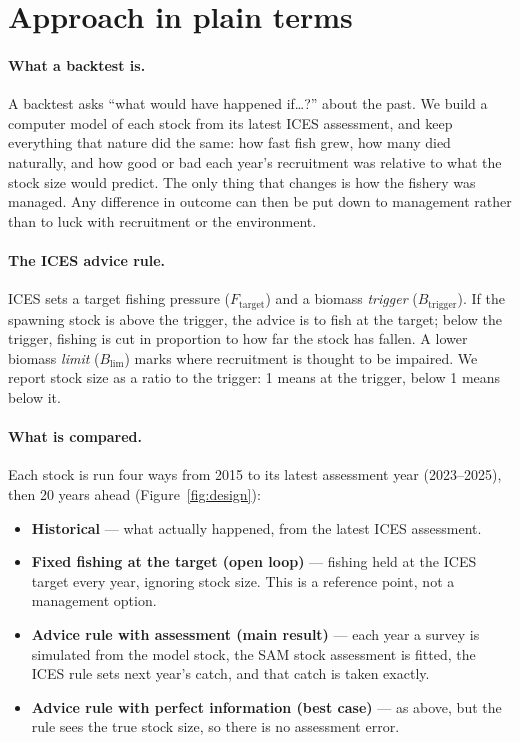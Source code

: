 \documentclass[11pt,a4paper]{article}
\newcommand{\Btrig}{B_{\mathrm{trigger}}}
\newcommand{\Blim}{B_{\mathrm{lim}}}
\newcommand{\Ftar}{F_{\mathrm{target}}}
\begin{document}
\section{Approach in plain terms}
\label{sec:approach}

\paragraph{What a backtest is.} A backtest asks ``what would have happened
if\dots?'' about the past. We build a computer model of each stock from its
latest ICES assessment, and keep everything that nature did the same: how
fast fish grew, how many died naturally, and how good or bad each year's
recruitment was relative to what the stock size would predict. The only
thing that changes is how the fishery was managed. Any difference in
outcome can then be put down to management rather than to luck with
recruitment or the environment.

\paragraph{The ICES advice rule.} ICES sets a target fishing pressure
($\Ftar$) and a biomass \emph{trigger} ($\Btrig$). If the spawning stock
is above the trigger, the advice is to fish at the target; below the
trigger, fishing is cut in proportion to how far the stock has fallen.
A lower biomass \emph{limit} ($\Blim$) marks where recruitment is thought
to be impaired. We report stock size as a ratio to the trigger: 1 means at
the trigger, below 1 means below it.

\paragraph{What is compared.} Each stock is run four ways from 2015 to its
latest assessment year (2023--2025), then 20 years ahead
(Figure~\ref{fig:design}):
\begin{itemize}
\item \textbf{Historical} --- what actually happened, from the latest ICES
assessment.
\item \textbf{Fixed fishing at the target (open loop)} --- fishing held at
the ICES target every year, ignoring stock size. This is a reference
point, not a management option.
\item \textbf{Advice rule with assessment (main result)} --- each year a
survey is simulated from the model stock, the SAM stock assessment is
fitted, the ICES rule sets next year's catch, and that catch is taken
exactly.
\item \textbf{Advice rule with perfect information (best case)} --- as
above, but the rule sees the true stock size, so there is no assessment
error.
\end{itemize}
\end{document}

